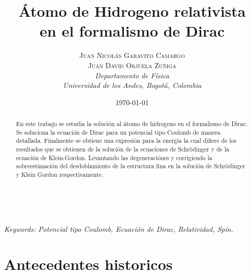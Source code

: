 \documentclass[a4paper, 12pt]{article} %
\title{\textbf{\'Atomo de Hidrogeno relativista}\\ %
 en el formalismo de Dirac} %
\author{\textsc{Juan Nicol\'as Garavito Camargo \\ Juan David Orjuela Z\'u\~niga} %
\\{\textit{Departamento de F\'isica\\}
\textit{Universidad de los Andes, Bogot\'a, Colombia}}} %
\date{\today} %
\makeatletter
\renewcommand{\maketitle}{ %
\begin{flushright} %
{\LARGE\@title} %

\vspace{50pt} %

{\large\@author} %
\\\@date %

\vspace{40pt} %
\end{flushright}
}
\makeatother
\begin{document}
\maketitle %



\begin{abstract}
En este trabajo se estudia la soluci\'on al \'atomo de hidrogeno en el formalismo de Dirac.
Se soluciona la ecuaci\'on de Dirac para un potencial tipo Coulomb de manera detallada. 
Finalmente se obtiene una expresi\'on para la energ\'ia la cual difiere de los resultados
que se obtienen de la soluci\'on de la ecuaciones de Schr\"odinger y de la ecuaci\'on de 
Klein-Gordon. Levantando las degeneraci\'ones  y corrigiendo la  sobreestimaci\'on 
del desdoblamiento de la estructura fina en la soluci\'on de Schr\"odinger y Klein 
Gordon respectivamente.
\end{abstract}
\hspace*{3,6mm}\textit{Keywords: Potencial tipo Coulomb, Ecuaci\'on de Dirac, Relatividad, Sp\'in. }  %

\vspace{30pt} %


\section{Antecedentes historicos}
\end{document}
